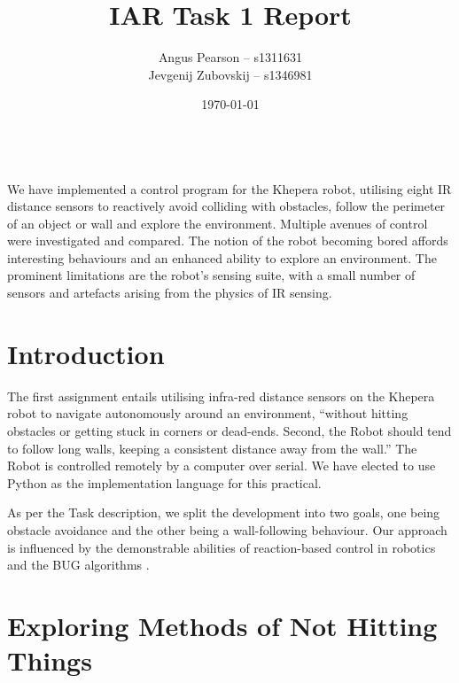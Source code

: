 \documentclass[11pt, a4paper]{article}
\renewenvironment{abstract}{%
{\mdseries\scshape\Large\abstractname}
\vspace{1em}\\
}{\par\noindent}
\begin{document}
\title{IAR Task 1 Report}
\author{Angus Pearson -- s1311631\\ Jevgenij Zubovskij -- s1346981}
\date{\today}
\maketitle



\begin{abstract}
  We have implemented a control program for the Khepera robot, utilising eight IR distance
  sensors to reactively avoid colliding with obstacles, follow the perimeter of an object 
  or wall  and explore the environment. Multiple avenues of control were investigated and 
  compared. The notion of the robot becoming bored affords interesting behaviours and an 
  enhanced ability to explore an environment. The prominent limitations are the robot's 
  sensing suite, with a small number of sensors and artefacts arising from the physics 
  of IR sensing.
\end{abstract}



\section{Introduction}

The first assignment entails utilising infra-red distance sensors on the Khepera 
robot to navigate autonomously around an environment, ``without hitting obstacles 
or getting stuck in corners or dead-ends. Second, the Robot should tend to follow long walls, 
keeping a consistent distance away from the wall.'' The Robot is controlled remotely 
 by a computer over serial. We have elected to use Python as the 
implementation language for this practical.

As per the Task description, we split the development into two goals, one being obstacle 
avoidance and the other being a wall-following behaviour. Our approach is influenced 
by the demonstrable abilities of reaction-based control in robotics and the BUG 
algorithms \cite{principlesrobot}.



\section{Exploring Methods of Not Hitting Things}
\end{document}
